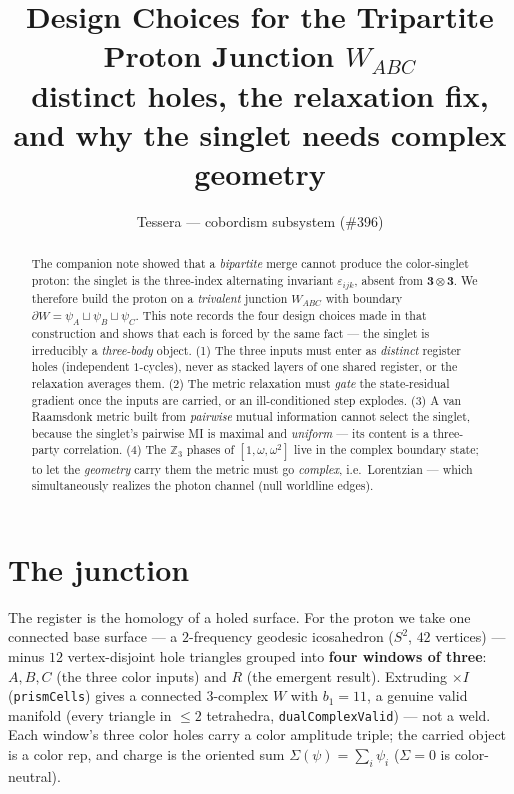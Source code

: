 \documentclass[11pt]{article}
\title{\bf Design Choices for the Tripartite Proton Junction $W_{ABC}$\\
\large distinct holes, the relaxation fix, and why the singlet needs complex geometry}
\author{Tessera --- cobordism subsystem (\#396)}
\date{}
\theoremstyle{definition}
\newcommand{\Z}{\mathbb{Z}}
\newcommand{\rep}[1]{\mathbf{#1}}
\newcommand{\Sg}{\Sigma}
\begin{document}
\maketitle

\begin{abstract}
The companion note showed that a \emph{bipartite} merge cannot produce the
color-singlet proton: the singlet is the three-index alternating invariant
$\varepsilon_{ijk}$, absent from $\rep 3\otimes\rep 3$. We therefore build the
proton on a \emph{trivalent} junction $W_{ABC}$ with boundary
$\partial W = \psi_A\sqcup\psi_B\sqcup\psi_C$. This note records the four design
choices made in that construction and shows that each is forced by the same fact
--- the singlet is irreducibly a \emph{three-body} object. (1) The three inputs
must enter as \emph{distinct} register holes (independent $1$-cycles), never as
stacked layers of one shared register, or the relaxation averages them. (2) The
metric relaxation must \emph{gate} the state-residual gradient once the inputs are
carried, or an ill-conditioned step explodes. (3) A van Raamsdonk metric built
from \emph{pairwise} mutual information cannot select the singlet, because the
singlet's pairwise MI is maximal and \emph{uniform} --- its content is a
three-party correlation. (4) The $\Z_3$ phases of $[1,\omega,\omega^2]$ live in
the complex boundary state; to let the \emph{geometry} carry them the metric must
go \emph{complex}, i.e.\ Lorentzian --- which simultaneously realizes the photon
channel (null worldline edges).
\end{abstract}

\section{The junction}

The register is the homology of a holed surface. For the proton we take one
connected base surface --- a $2$-frequency geodesic icosahedron ($S^2$, $42$
vertices) --- minus $12$ vertex-disjoint hole triangles grouped into \textbf{four
windows of three}: $A,B,C$ (the three color inputs) and $R$ (the emergent
result). Extruding $\times I$ (\texttt{prismCells}) gives a connected $3$-complex
$W$ with $b_1 = 11$, a genuine valid manifold (every triangle in $\le 2$
tetrahedra, \texttt{dualComplexValid}) --- not a weld. Each window's three color
holes carry a color amplitude triple; the carried object is a color rep, and
charge is the oriented sum $\Sg(\psi)=\sum_i\psi_i$ ($\Sg=0$ is color-neutral).
\end{document}
